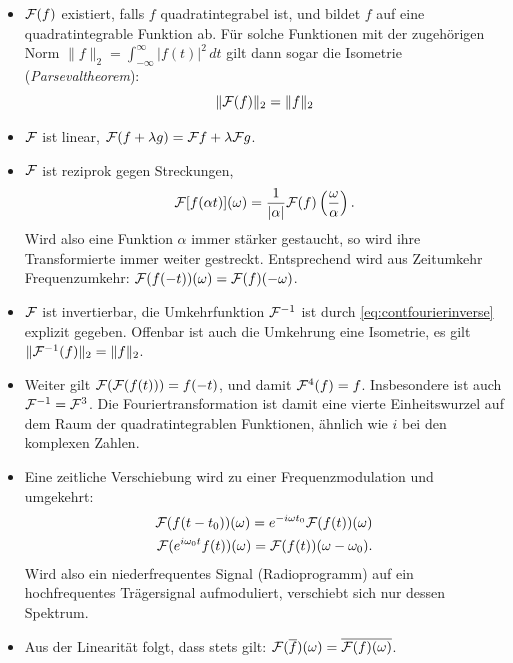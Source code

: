 \begin{itemize}
\item $\mathcal F(f)$ existiert, falls $f$ quadratintegrabel ist, und
  bildet $f$ auf eine quadratintegrable Funktion ab. Für solche
  Funktionen mit der zugehörigen Norm $\lVert f \rVert_2 =
  \int_{-\infty}^{\infty} \lvert f(t) \rvert^2\,dt$ gilt dann sogar
  die Isometrie
  (\emph{Parsevaltheorem}):
  \begin{equation}
    \lVert \mathcal F(f) \rVert_2 = \lVert f \rVert_2
  \end{equation}
\item $\mathcal F$ ist linear, \dh $\mathcal F(f + \lambda g) = \mathcal F{f} + \lambda
  \mathcal F{g}$.
\item $\mathcal F$ ist reziprok gegen Streckungen, \dh
  \begin{equation}
    \label{eq:fourierreziprok}
    \mathcal F[f(\alpha
    t)](\omega) = \frac{1}{\lvert \alpha \rvert}
    \mathcal F(f)\left(\frac{\omega}{\alpha}\right).
  \end{equation}
  Wird also eine Funktion $\alpha$ immer stärker gestaucht, so wird
  ihre Transformierte immer weiter gestreckt.  Entsprechend wird aus
  Zeitumkehr Frequenzumkehr: $\mathcal F(f(-t))(\omega) = \mathcal F(f)(-\omega)$.
\item $\mathcal F$ ist invertierbar, die Umkehrfunktion $\mathcal F^{-1}$ ist durch
  \eqref{eq:contfourierinverse} explizit gegeben. Offenbar ist auch
  die Umkehrung eine Isometrie, es gilt $\lVert \mathcal F^{-1}(f)
  \rVert_2 =\lVert f \rVert_2$.
\item Weiter gilt $\mathcal F(\mathcal F(f(t))) = f(-t)$, und damit $\mathcal F^4(f) =
  f$. Insbesondere ist auch $\mathcal F^{-1} = \mathcal F^3$. Die
  Fouriertransformation ist damit eine vierte Einheitswurzel auf dem
  Raum der quadratintegrablen Funktionen, ähnlich wie $i$ bei den
  komplexen Zahlen.
\item Eine zeitliche Verschiebung wird zu einer Frequenzmodulation und
  umgekehrt:
  \begin{eqnarray}
    \label{eq:fouriertimeshift}
    \mathcal F(f(t-t_0))(\omega) = e^{-i\omega t_0} \mathcal F(f(t))(\omega)\\
    \label{eq:fourierfreqshift}
    \mathcal F(e^{i\omega_0 t}f(t))(\omega) = \mathcal F(f(t))(\omega-\omega_0).
  \end{eqnarray}
  Wird also ein niederfrequentes Signal (Radioprogramm) auf ein
  hochfrequentes Trägersignal aufmoduliert, verschiebt sich nur dessen
  Spektrum. 
\item Aus der Linearität folgt, dass stets gilt:
  $\mathcal F(\overline{f})(\omega) = \overline{\mathcal F(f)(\omega)}$.

\end{itemize}
